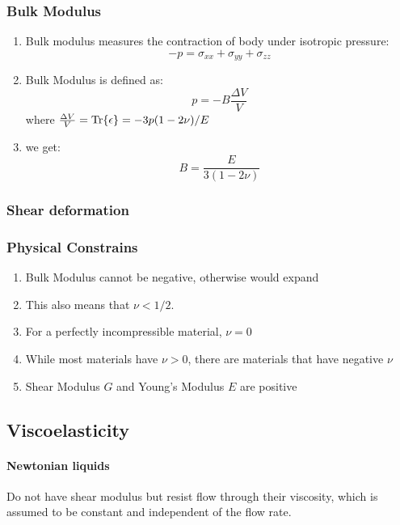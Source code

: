 \documentclass[12pt,a4paper]{article}
\begin{document}
    \subsubsection{Bulk Modulus}
        \begin{enumerate}
            \item Bulk modulus measures the contraction of body under isotropic pressure:
            \begin{equation}
                -p= \sigma_{xx}+\sigma_{yy}+\sigma_{zz}
            \end{equation}
            \item Bulk Modulus is defined as:
            \begin{equation}
                p=-B\frac{\Delta V}{V} 
            \end{equation}
            where $\frac{\Delta V}{V} = \Tr{\epsilon}=-3p(1-2\nu)/E$
            \item we get:
            \begin{equation}
                B = \frac{E}{3(1-2\nu)}
            \end{equation}
        \end{enumerate}
    \subsubsection{Shear deformation}
    \subsubsection{Physical Constrains}
        \begin{enumerate}
            \item Bulk Modulus cannot be negative, otherwise would expand
            \item This also means that $\nu <1/2$.
            \item For a perfectly incompressible material, $\nu = 0$
            \item While most materials have $\nu > 0$, there are materials that have negative $\nu$
            \item Shear Modulus $G$ and Young's Modulus $E$ are positive 
        \end{enumerate}
\subsection{Viscoelasticity}
    \paragraph*{Newtonian liquids}
        Do not have shear modulus but resist flow through their viscosity, which is assumed to be constant and independent of the flow rate.
\end{document}
